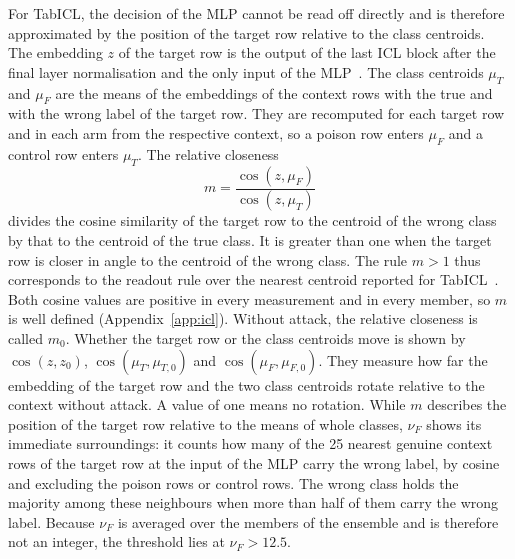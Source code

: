 \documentclass[pdflatex,sn-mathphys-num]{sn-jnl}
\begin{document}
For TabICL, the decision of the MLP cannot be read off directly and is
therefore approximated by the position of the target row relative to the
class centroids. The embedding $z$ of the target row is the output of the
last ICL block after the final layer normalisation and the only input of
the MLP~\citep{qu2026}. The class centroids $\mu_T$ and $\mu_F$ are the
means of the embeddings of the context rows with the true and with the
wrong label of the target row. They are recomputed for each target row and
in each arm from the respective context, so a poison row enters $\mu_F$
and a control row enters $\mu_T$.
The relative closeness
\[
  m = \frac{\cos(z, \mu_F)}{\cos(z, \mu_T)}
\]
divides the cosine similarity of the target row to the centroid of the
wrong class by that to the centroid of the true class. It is greater than
one when the target row is closer in angle to the centroid of the wrong
class. The rule $m > 1$ thus corresponds to the readout rule over the
nearest centroid reported for TabICL~\citep{bilos2026}. Both cosine
values are positive in every measurement and in every member, so $m$ is
well defined (Appendix~\ref{app:icl}). Without attack, the relative
closeness is called $m_0$. Whether the target row or the class centroids
move is shown by $\cos(z, z_0)$, $\cos(\mu_T, \mu_{T,0})$ and
$\cos(\mu_F, \mu_{F,0})$. They measure how far the embedding of the
target row and the two class centroids rotate relative to the context
without attack. A value of one means no rotation. While $m$
describes the position of the target row relative to the means of whole
classes, $\nu_F$ shows its immediate surroundings: it counts how many of
the 25 nearest genuine context rows of the target row at the input of the
MLP carry the wrong label, by cosine and excluding the poison rows or control
rows. The
wrong class holds the majority among these neighbours when more than half
of them carry the wrong label. Because $\nu_F$ is averaged over the members of the ensemble and
is therefore not an integer, the threshold lies at
$\nu_F > 12.5$.
\end{document}
